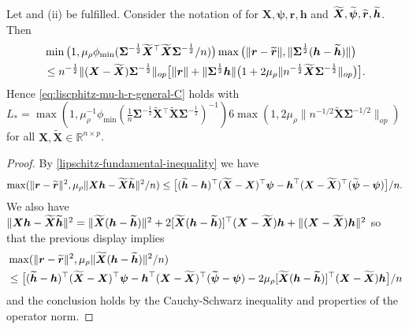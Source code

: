 \documentclass[11pt]{amsart}
\numberwithin{equation}{section}
\numberwithin{equation}{section}
\def\real{{\mathbb{R}}}
\def\R{{\real}}
\def\mathbold{\boldsymbol} %
\def\bh{\mathbold{h}}\def\hhat{\widehat{h}}\def\htil{\widetilde{h}}
\def\br{\mathbold{r}}\def\rhat{\widehat{r}}\def\rtil{\widetilde{r}}\def\rbar{{\overline r}}\def\brbar{{\overline \br}}
\def\bX{\mathbold{X}}\def\hbX{{\widehat{\bX}}}\def\tbX{{\widetilde{\bX}}}\def\bXbar{{\overline \bX}}
\def\bSigma{\mathbold{\Sigma}}\def\hbSigma{{\widehat{\bSigma}}}
\def\bpsi{\mathbold{\psi}}\def\psihat{\widehat{\psi}}\def\hpsi{\widehat{\psi}}
\begin{document}
\begin{proposition}
    \label{prop:lipschtiz2-gamma-less-one}
    Let  and (ii) be fulfilled.
    Consider the notation of  for
    $\bX,\bpsi,\br,\bh$ and $\tbX,\tbpsi,\tbr,\tbh$.
    Then 
    \begin{align*}
      & \min\big(1, \mu_\rho\phi_{\min}(\bSigma^{-\frac12}\tbX{}^\top\tbX\bSigma^{-\frac12}/n)\big)
      \max\big(\|\br-\tbr\|, \|\bSigma^{\frac12}(\bh-\tbh)\|\big)
        \\&\le
        n^{-\frac12}\|(\bX-\tbX)\bSigma^{-\frac12}\|_{op}
        \big[\|\br\| + \|\bSigma^{\frac12}\bh\|
            \big(
            1 +
            2\mu_\rho\|n^{-\frac12}\tbX\bSigma^{-\frac12}\|_{op}
            \big)
        \big].
        \nonumber
    \end{align*}
    Hence \eqref{eq:liscphitz-mu-h-r-general-C} holds
    with $L_*= \max(1, \mu_\rho^{-1}
    \phi_{\min}(\frac1n\bSigma^{-\frac12}\tbX{}^\top\tbX\bSigma^{-\frac12})^{-1}
    )
    6\max(1, 2\mu_\rho \|n^{-1/2}\tbX\bSigma^{-1/2}\|_{op})
    $
    for all $\bX,\tbX\in\R^{n\times p}$.
\end{proposition}
\begin{proof}
    By  \eqref{lipschitz-fundamental-inequality} we have
    \begin{align*}
        \nonumber
      \max(\|\br-\tbr\|^2, \mu_\rho\|\bX\bh -\tbX\tbh\|^2/n)
        \le
        \big[
        (\tbh - \bh)^\top(\tbX-\bX)^\top\bpsi
        -
        \bh^\top(\bX-\tbX)^\top(\tbpsi - \bpsi)
        \big]/n.
    \end{align*}
    We also have 
    $\|\bX\bh -\tbX\tbh\|^2
    = \|\tbX(\bh-\tbh)\|^2
    + 2[\tbX(\bh-\tbh)]^\top(\bX-\tbX)\bh
    + \|(\bX-\tbX)\bh\|^2$
    so that the previous display implies
    \begin{equation}
    \begin{aligned}
      & \max(\|\br-\tbr\|^2, \mu_\rho\|\tbX(\bh -\tbh)\|^2/n)
        \\&\le
        \big[
        (\tbh - \bh)^\top(\tbX-\bX)^\top\bpsi
        -
        \bh^\top(\bX-\tbX)^\top(\tbpsi - \bpsi)
        - 2\mu_\rho[\tbX(\bh-\tbh)]^\top(\bX-\tbX)\bh
        \big]/n
    \end{aligned}
    \label{eq:useful-lasso}
    \end{equation}
    and the conclusion holds by the Cauchy-Schwarz
    inequality and properties of the operator norm.
\end{proof}
\end{document}
